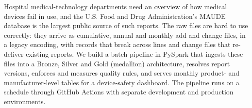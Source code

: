 Hospital medical-technology departments need an overview of how medical devices fail in use,
and the U.S. Food and Drug Administration's MAUDE database is the largest public source of such
reports. The raw files are hard to use correctly: they arrive as cumulative, annual and monthly
add and change files, in a legacy encoding, with records that break across lines and change
files that re-deliver existing reports. We build a batch pipeline in PySpark that ingests these
files into a Bronze, Silver and Gold (medallion) architecture, resolves report versions, enforces
and measures quality rules, and serves monthly product- and manufacturer-level tables for a
device-safety dashboard. The pipeline runs on a schedule through GitHub Actions with separate
development and production environments.
